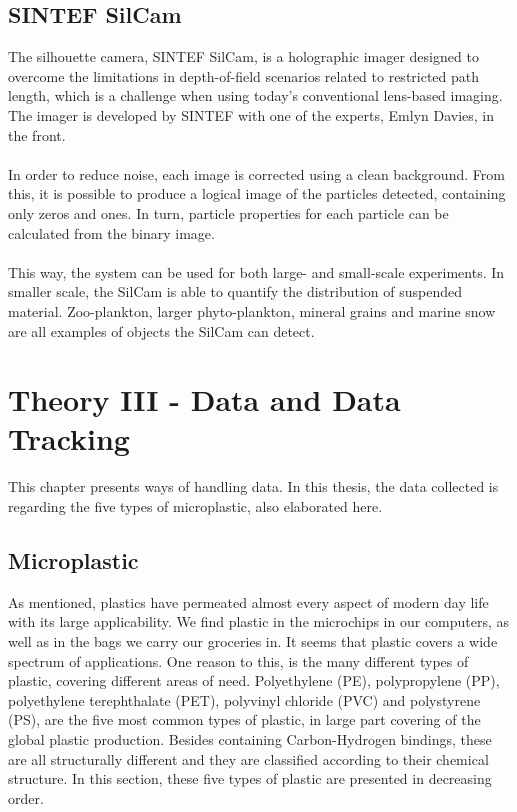 \vspace{1.3cm}
\section{SINTEF SilCam}
The silhouette camera, SINTEF SilCam, is a holographic imager designed to overcome the limitations in depth-of-field scenarios related to restricted path length, which is a challenge when using today's conventional lens-based imaging. The imager is developed by SINTEF with one of the experts, Emlyn Davies, in the front.
\\\\
In order to reduce noise, each image is corrected using a clean background. From this, it is possible to produce a logical image of the particles detected, containing only zeros and ones. In turn, particle properties for each particle can be calculated from the binary image.
\\\\
This way, the system can be used for both large- and small-scale experiments. In smaller scale, the SilCam is able to quantify the distribution of suspended material. Zoo-plankton, larger phyto-plankton, mineral grains and marine snow are all examples of objects the SilCam can detect. 

\chapter{Theory III - Data and Data Tracking} \label{cap:theory3}
This chapter presents ways of handling data. In this thesis, the data collected is regarding the five types of microplastic, also elaborated here. 

\section{Microplastic} \label{sec:microplastic}
\noindent
As mentioned, plastics have permeated almost every aspect of modern day life with its large applicability. We find plastic in the microchips in our computers, as well as in the bags we carry our groceries in. It seems that plastic covers a wide spectrum of applications.  One reason to this, is the many different types of plastic, covering different areas of need. Polyethylene (PE), polypropylene (PP), polyethylene terephthalate (PET), polyvinyl chloride (PVC) and polystyrene (PS), are the five most common types of plastic, in large part covering of the global plastic production. Besides containing Carbon-Hydrogen bindings, these are all structurally different and they are classified according to their chemical structure. In this section, these five types of plastic are presented in decreasing order. 
\\\\

